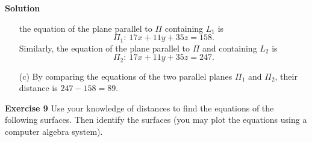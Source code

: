 \documentclass[12pt,oneside]{exam}
\newenvironment{exercise}[1]{\vspace{.1in}\noindent\textbf{Exercise #1 \hspace{.05em}}}{}
\newenvironment{newsolution}{\vspace{.1in}\noindent\textbf{Solution \hspace{.05em}}}{}
\begin{document}
\begin{newsolution}
\begin{itemize}
\begin{equation*}
\end{equation*}
the equation of the plane parallel to $\Pi$ containing $L_1$ is 
\begin{equation*}
\Pi_1 \colon \ 17x + 11 y + 35 z = 158. 
\end{equation*}
Similarly, the equation of the plane parallel to $\Pi$ and containing $L_2$ is 
\begin{equation*}
\Pi_2 \colon \ 17x + 11 y + 35 z = 247.
\end{equation*}
\item[(c)] By comparing the equations of the two parallel planes $\Pi_1$ and $\Pi_2$, their distance is $247-158=89$. 
\end{itemize}
\end{newsolution}

\begin{exercise}{9}
Use your knowledge of distances to find the equations of the following surfaces. Then identify the surfaces (you may plot the equations using a computer algebra system). 
\end{exercise}
\end{document}
